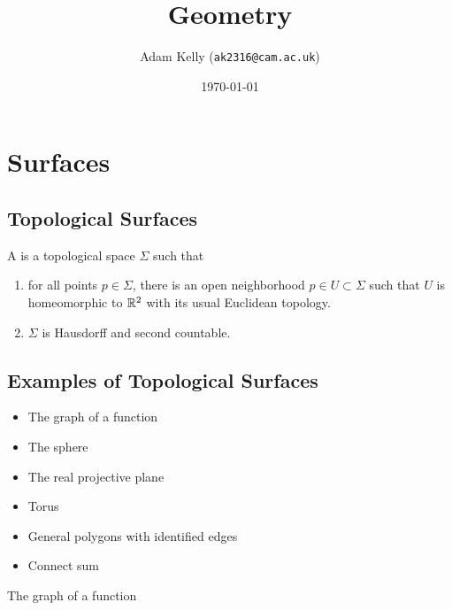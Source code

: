 \documentclass[a4paper, twocolumn]{article}
\title{Geometry}
\author{Adam Kelly (\texttt{ak2316@cam.ac.uk})}
\date{\today}
\begin{document}
\maketitle





\section{Surfaces}

\subsection{Topological Surfaces}

\begin{definition}
  A  is a topological space $\Sigma$ such that
  \begin{enumerate}[label=(\roman*)]
    \item for all points $p \in \Sigma$, there is an open neighborhood $p \in U \subset \Sigma$ such that $U$ is homeomorphic to $\mathbb{R}^2$ with its usual Euclidean topology.
    \item $\Sigma$ is Hausdorff and second countable.
  \end{enumerate}
\end{definition}

\subsection{Examples of Topological Surfaces}

\begin{itemize}
  \item The graph of a function
  \item The sphere
  \item The real projective plane
  \item Torus
  \item General polygons with identified edges
  \item Connect sum
\end{itemize}
The graph of a function
\end{document}
